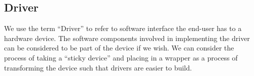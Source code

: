 \subsection{Driver}

We use the term ``Driver'' to refer to software interface the end-user
has to a hardware device.  The software components involved in
implementing the driver can be considered to be part of the device if
we wish.  We can consider the process of taking a ``sticky device''
and placing in a wrapper as a process of transforming the device such
that drivers are easier to build.



